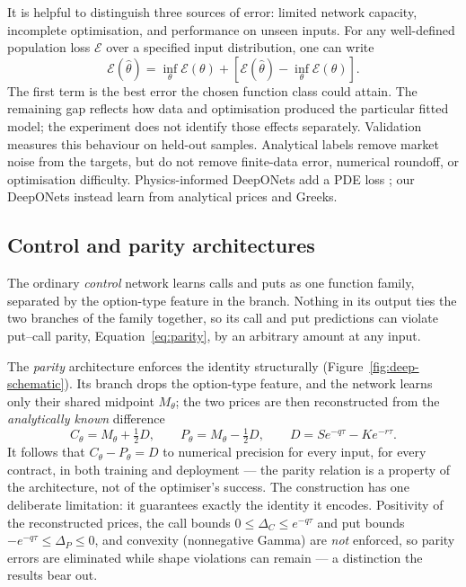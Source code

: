 \documentclass[11pt,a4paper]{article}
\begin{document}
It is helpful to distinguish three sources of error: limited network capacity, incomplete optimisation, and performance on unseen inputs. For any well-defined population loss $\mathcal E$ over a specified input distribution, one can write
\begin{equation}
\mathcal E(\widehat\theta)=\inf_\theta\mathcal E(\theta)
+\left[\mathcal E(\widehat\theta)-\inf_\theta\mathcal E(\theta)\right].
\label{eq:deeponet-error}
\end{equation}
The first term is the best error the chosen function class could attain. The remaining gap reflects how data and optimisation produced the particular fitted model; the experiment does not identify those effects separately. Validation measures this behaviour on held-out samples. Analytical labels remove market noise from the targets, but do not remove finite-data error, numerical roundoff, or optimisation difficulty. Physics-informed DeepONets add a PDE loss \cite{wang2021}; our DeepONets instead learn from analytical prices and Greeks.


\subsection{Control and parity architectures}
\label{sec:deeponet-arch}

The ordinary \emph{control} network learns calls and puts as one function family, separated by the option-type feature in the branch. Nothing in its output ties the two branches of the family together, so its call and put predictions can violate put--call parity, Equation~\eqref{eq:parity}, by an arbitrary amount at any input.

The \emph{parity} architecture enforces the identity structurally (Figure~\ref{fig:deep-schematic}). Its branch drops the option-type feature, and the network learns only their shared midpoint $M_\theta$; the two prices are then reconstructed from the \emph{analytically known} difference
\begin{equation}
C_\theta=M_\theta+\tfrac12D,\qquad
P_\theta=M_\theta-\tfrac12D,\qquad
D=Se^{-q\tau}-Ke^{-r\tau}. \label{eq:parity-deeponet}
\end{equation}
It follows that $C_\theta-P_\theta=D$ to numerical precision for every input, for every contract, in both training and deployment --- the parity relation is a property of the architecture, not of the optimiser's success. The construction has one deliberate limitation: it guarantees exactly the identity it encodes. Positivity of the reconstructed prices, the call bounds $0\leq\Delta_C\leq e^{-q\tau}$ and put bounds $-e^{-q\tau}\leq\Delta_P\leq0$, and convexity (nonnegative Gamma) are \emph{not} enforced, so parity errors are eliminated while shape violations can remain --- a distinction the results bear out.
\end{document}
